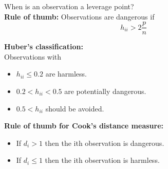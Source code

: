 When is an observation a leverage point?\\
\textbf{Rule of thumb:} Observations are dangerous if\\
\begin{equation}
  h_{ii} > 2 \frac{p}{n}
\end{equation}

\textbf{Huber's classification:}\\ Observations with
\begin{itemize}
  \item $h_{ii} \leq 0.2$ are harmless.
  \item $ 0.2 < h_{ii} < 0.5$ are potentially dangerous.
  \item $0.5 < h_{ii}$ should be avoided.
\end{itemize}

\textbf{Rule of thumb for Cook's distance measure:}
\begin{itemize}
  \item If $d_i > 1$ then the ith observation is dangerous.
  \item If $d_i \leq 1$ then the ith observation is harmless.
\end{itemize}


